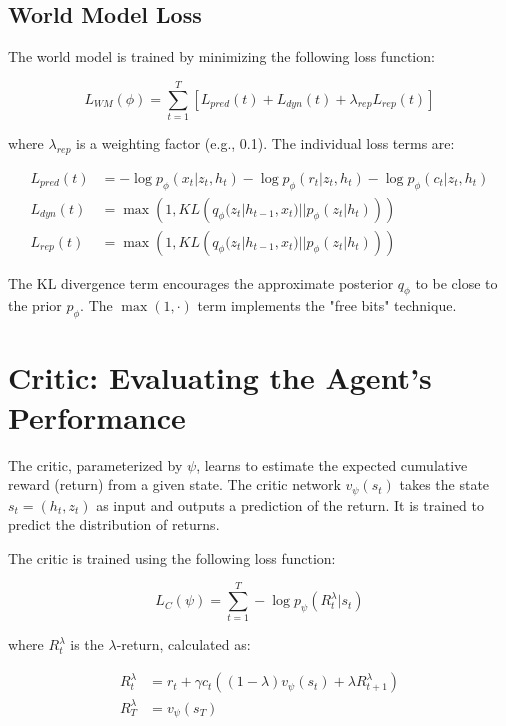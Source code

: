 \subsection{World Model Loss}

The world model is trained by minimizing the following loss function:

\begin{equation}
L_{WM}(\phi) = \sum_{t=1}^T \left[ L_{pred}(t) + L_{dyn}(t) + \lambda_{rep} L_{rep}(t) \right]
\end{equation}

where $\lambda_{rep}$ is a weighting factor (e.g., 0.1). The individual loss terms are:

\begin{align}
L_{pred}(t) &= -\log p_\phi(x_t | z_t, h_t) - \log p_\phi(r_t | z_t, h_t) - \log p_\phi(c_t | z_t, h_t) \\
L_{dyn}(t) &= \max\left(1, KL\left(q_\phi(z_t | h_{t-1}, x_t) || p_\phi(z_t | h_t)\right)\right) \\
L_{rep}(t) &= \max\left(1, KL\left(q_\phi(z_t | h_{t-1}, x_t) || p_\phi(z_t | h_t)\right)\right)
\end{align}

The KL divergence term encourages the approximate posterior $q_\phi$ to be close to the prior $p_\phi$. The $\max(1, \cdot)$ term implements the "free bits" technique.

\section{Critic: Evaluating the Agent's Performance}

The critic, parameterized by $\psi$, learns to estimate the expected cumulative reward (return) from a given state. The critic network $v_\psi(s_t)$ takes the state $s_t = (h_t, z_t)$ as input and outputs a prediction of the return.  It is trained to predict the distribution of returns.

The critic is trained using the following loss function:

\begin{equation}
L_C(\psi) = \sum_{t=1}^T -\log p_\psi(R_t^\lambda | s_t)
\end{equation}

where $R_t^\lambda$ is the $\lambda$-return, calculated as:

\begin{align}
R_t^\lambda &= r_t + \gamma c_t \left( (1-\lambda) v_\psi(s_t) + \lambda R_{t+1}^\lambda \right) \\
R_T^\lambda &= v_\psi(s_T)
\end{align}

